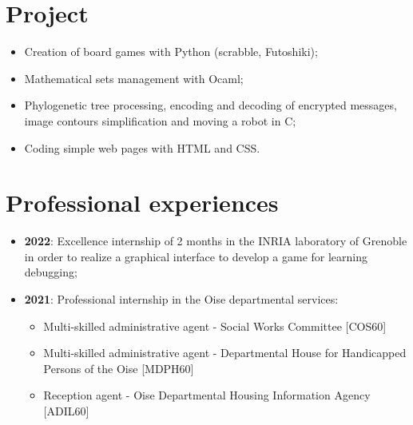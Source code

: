 \documentclass[10pt, oneside, a4paper, titlepage]{article}
\begin{document}
\begin{tcolorbox}
\begin{minipage}[t]{12cm}
\begin{tcolorbox}[grow to right by = 0.6cm, colback = gray!25, colframe = white]
                \section*{Project}
                \begin{itemize}
                    \item Creation of board games with Python (scrabble, Futoshiki);
                    \item Mathematical sets management with Ocaml;
                    \item Phylogenetic tree processing, encoding and decoding of 
                    encrypted messages, image contours simplification and moving 
                    a robot in C;
                    \item Coding simple web pages with HTML and CSS.

                \end{itemize}
                
                \section*{Professional experiences}
                \begin{itemize}
                    \item \textbf{2022}: Excellence internship of 2 months in the INRIA 
                    laboratory of Grenoble in order to realize a 
                    graphical interface to develop a game for learning
                    debugging;
                    \item \textbf{2021}: Professional internship in the Oise departmental services:
                    \begin{itemize}
                        
                        \item Multi-skilled administrative agent -  Social Works Committee [COS60]
                        \item Multi-skilled administrative agent - Departmental House for Handicapped Persons of the Oise [MDPH60]
                        \item Reception agent - Oise Departmental Housing Information Agency [ADIL60]
                        
                        
                        
                    \end{itemize}
                

\end{itemize}
\end{tcolorbox}
\end{minipage}
\end{tcolorbox}
\end{document}
